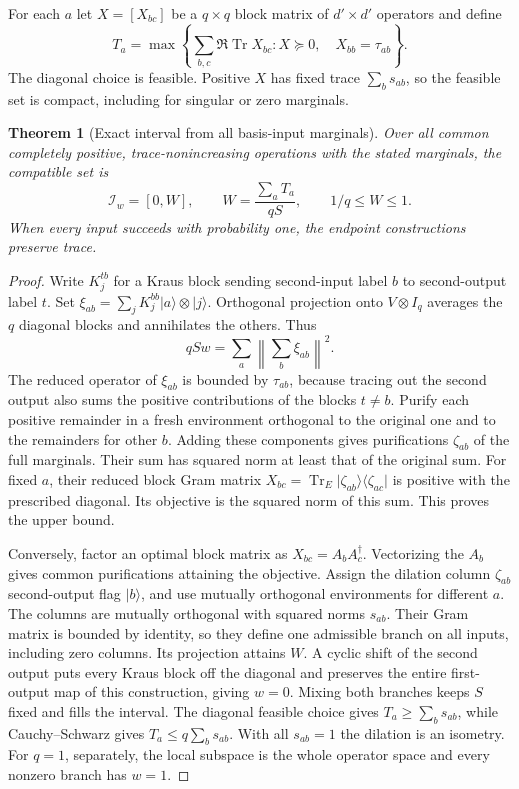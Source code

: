 \documentclass[11pt,letterpaper]{article}
\newtheorem{theorem}{Theorem}\newtheorem{proposition}[theorem]{Proposition}
\newcommand{\tr}{\operatorname{Tr}}\newcommand{\ket}[1]{\lvert#1\rangle}\newcommand{\proj}[1]{\ket{#1}\!\langle#1\rvert}
\begin{document}
For each $a$ let $X=[X_{bc}]$ be a $q\times q$ block matrix of $d'\times d'$ operators and define
\[
 T_a=\max\left\{\sum_{b,c}\Re\tr X_{bc}:X\succeq0,\quad X_{bb}=\tau_{ab}\right\}.
\]
The diagonal choice is feasible. Positive $X$ has fixed trace $\sum_b s_{ab}$, so the feasible set is compact, including for singular or zero marginals.

\begin{theorem}[Exact interval from all basis-input marginals]
Over all common completely positive, trace-nonincreasing operations with the stated marginals, the compatible set is
\[
 \boxed{\mathcal I_w=[0,W],\qquad W=\frac{\sum_aT_a}{qS},\qquad 1/q\le W\le1.}
\]
When every input succeeds with probability one, the endpoint constructions preserve trace.
\end{theorem}
\begin{proof}
Write $K_j^{tb}$ for a Kraus block sending second-input label $b$ to second-output label $t$. Set $\xi_{ab}=\sum_j K_j^{bb}\ket a\otimes\ket j$. Orthogonal projection onto $V\otimes I_q$ averages the $q$ diagonal blocks and annihilates the others. Thus
\[
 qSw=\sum_a\left\|\sum_b\xi_{ab}\right\|^2 .
\]
The reduced operator of $\xi_{ab}$ is bounded by $\tau_{ab}$, because tracing out the second output also sums the positive contributions of the blocks $t\ne b$. Purify each positive remainder in a fresh environment orthogonal to the original one and to the remainders for other $b$. Adding these components gives purifications $\zeta_{ab}$ of the full marginals. Their sum has squared norm at least that of the original sum. For fixed $a$, their reduced block Gram matrix $X_{bc}=\tr_E\ket{\zeta_{ab}}\!\langle\zeta_{ac}|$ is positive with the prescribed diagonal. Its objective is the squared norm of this sum. This proves the upper bound.

Conversely, factor an optimal block matrix as $X_{bc}=A_bA_c^\dagger$. Vectorizing the $A_b$ gives common purifications attaining the objective. Assign the dilation column $\zeta_{ab}$ second-output flag $\ket b$, and use mutually orthogonal environments for different $a$. The columns are mutually orthogonal with squared norms $s_{ab}$. Their Gram matrix is bounded by identity, so they define one admissible branch on all inputs, including zero columns. Its projection attains $W$. A cyclic shift of the second output puts every Kraus block off the diagonal and preserves the entire first-output map of this construction, giving $w=0$. Mixing both branches keeps $S$ fixed and fills the interval. The diagonal feasible choice gives $T_a\ge\sum_b s_{ab}$, while Cauchy--Schwarz gives $T_a\le q\sum_b s_{ab}$. With all $s_{ab}=1$ the dilation is an isometry. For $q=1$, separately, the local subspace is the whole operator space and every nonzero branch has $w=1$.
\end{proof}
\end{document}
